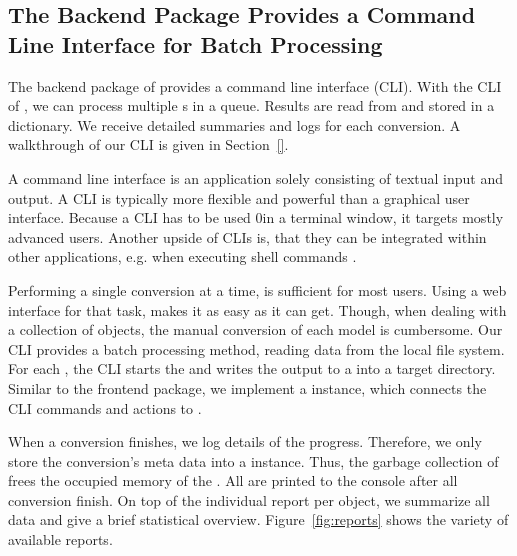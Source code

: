 \documentclass[../../ClassicThesis.tex]{subfiles}
\begin{document}
\subsection{The Backend Package Provides a Command Line Interface for
  Batch Processing}
\label{sec:cli-tool}





The backend package of {\platener} provides a command line interface
(CLI). With the CLI of {\platener}, we can process multiple
{\threedmodel}s in a queue. Results are read from and stored in
a dictionary. We receive detailed summaries and logs for each
conversion. A walkthrough of our CLI is given in
Section~\ref{}.

A command line interface is an application solely consisting of
textual input and output. A CLI is typically more flexible and
powerful than a graphical user interface. Because a CLI has to be used
0in a terminal window, it targets mostly advanced users. Another upside
of CLIs is, that they can be integrated within other applications,
e.g. when executing shell commands \cite{cli}.

Performing a single conversion at a time, is sufficient for most
users. Using a web interface for that task, makes it as easy as it can
get. Though, when dealing with a collection of objects, the manual
conversion of each model is cumbersome. Our CLI provides a batch
processing method, reading data from the local file system. For each
{\stlfile}, the CLI starts the  and writes the
output to a {\zipfile} into a target directory. Similar to the
frontend package, we implement a  instance, which
connects the CLI commands and actions to {\convertify}.

When a conversion finishes, we log details of the progress. Therefore,
we only store the conversion's meta data into a  instance. Thus, the
garbage collection of {\javascript} frees the occupied memory of the
{\threedmodel}. All  are printed to the console after
all conversion finish. On top of the individual report per object, we
summarize all data and give a brief statistical overview.
Figure~\ref{fig:reports} shows the variety of available reports.
\end{document}
